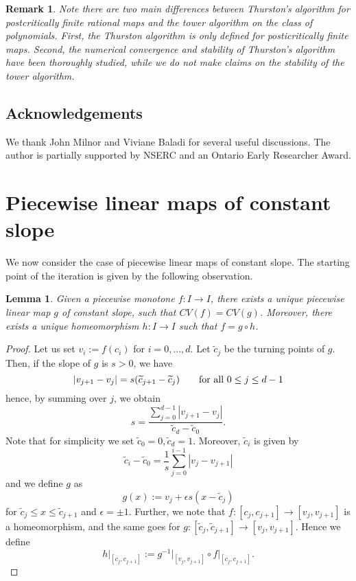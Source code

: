 \documentclass[11pt]{amsart}
\newtheorem{lemma}[theorem]{Lemma}
\newtheorem{remark}[theorem]{Remark}
\begin{document}
\begin{remark} \label{R:algo}
Note there are two main differences between Thurston's algorithm for postcritically finite rational maps and 
the tower algorithm on the class of polynomials. First, the Thurston algorithm is only defined for posticritically finite maps. 
Second, the numerical convergence and stability of Thurston's algorithm have been thoroughly studied, while we do not make claims 
on the stability of the tower algorithm.
\end{remark}

\subsection*{Acknowledgements}
We thank John Milnor and Viviane Baladi for several useful discussions. 
The author is partially supported by NSERC and an Ontario Early Researcher Award. 

\section{Piecewise linear maps of constant slope}

We now consider the case of piecewise linear maps of constant slope.
The starting point of the iteration is given by the following observation. 

\begin{lemma}
Given a piecewise monotone $f : I \to I$, there exists a unique piecewise linear map $g$ of constant slope, such that $CV(f) = CV(g)$.
Moreover, there exists a unique homeomorphism $h : I \to I$ such that $f = g \circ h$.
\end{lemma}

\begin{proof}
Let us set $v_i := f(c_i)$ for $i = 0, \dots, d$. Let $\widetilde{c}_j$ be the turning points of $g$. Then, if the slope of $g$ is $s > 0$, we have 
$$ |v_{j+1} - v_j| =  s(\widetilde{c}_{j+1} - \widetilde{c}_j) \qquad \textup{for all }0 \leq j \leq d-1$$
hence, by summing over $j$, we obtain 
$$s = \frac{\sum_{j = 0}^{d-1} |v_{j+1} - v_j|}{\widetilde{c}_d - \widetilde{c}_0}.$$
Note that for simplicity we set $\widetilde{c}_0 = 0, \widetilde{c}_d = 1$. Moreover, $\widetilde{c}_i$ is given by 
$$\widetilde{c}_i - \widetilde{c}_0 = \frac{1}{s} \sum_{j = 0}^{i-1} |v_j - v_{j+1}|$$
and we define $g$ as 
$$g(x) := v_j + \epsilon s (x- \widetilde{c}_j) $$
for $\widetilde{c}_j \leq x \leq \widetilde{c}_{j+1}$ and $\epsilon = \pm 1$.
Further,  we note that $f : [c_j, c_{j+1}] \to [v_j, v_{j+1}]$ is a homeomorphism, and the same goes for $g : [\widetilde{c}_j, \widetilde{c}_{j+1}] \to [v_j, v_{j+1}]$.
Hence we define 
$$h\vert_{[c_j, c_{j+1}]} := g^{-1}\vert_{[v_j, v_{j+1}]} \circ f\vert_{[c_j, c_{j+1}]}.$$
\end{proof}
\end{document}
